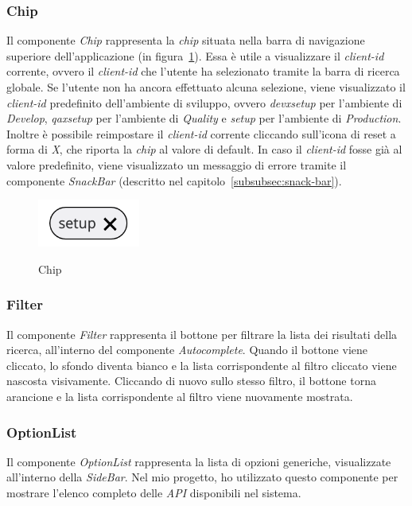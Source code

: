 \subsubsection{Chip}\label{subsubsec:chip}
Il componente \textit{Chip} rappresenta la \textit{chip} situata nella barra di navigazione superiore dell'applicazione (in figura~\ref{fig:chip}).
Essa è utile a visualizzare il \textit{client-id} corrente, ovvero il \textit{client-id} che l'utente ha selezionato tramite la barra di ricerca globale.
Se l'utente non ha ancora effettuato alcuna selezione, viene visualizzato il \textit{client-id} predefinito dell'ambiente di sviluppo, ovvero \textit{devxsetup} per l'ambiente di \textit{Develop}, \textit{qaxsetup} per l'ambiente di \textit{Quality} e \textit{setup} per l'ambiente di \textit{Production}.
Inoltre è possibile reimpostare il \textit{client-id} corrente cliccando sull'icona di reset a forma di \textit{X}, che riporta la \textit{chip} al valore di default.
In caso il \textit{client-id} fosse già al valore predefinito, viene visualizzato un messaggio di errore tramite il componente \textit{SnackBar} (descritto nel capitolo~\ref{subsubsec:snack-bar}).

\begin{figure}[ht]
  \centering
  \includegraphics[width=0.3\textwidth, alt={Chip contenente il client id corrente}]{images/frontend/Chip.jpg}
  \caption{Chip}\label{fig:chip}
\end{figure}


\subsubsection{Filter}\label{subsubsec:filter}
Il componente \textit{Filter} rappresenta il bottone per filtrare la lista dei risultati della ricerca, all'interno del componente \textit{Autocomplete}.
Quando il bottone viene cliccato, lo sfondo diventa bianco e la lista corrispondente al filtro cliccato viene nascosta visivamente.
Cliccando di nuovo sullo stesso filtro, il bottone torna arancione e la lista corrispondente al filtro viene nuovamente mostrata.


\subsubsection{OptionList}\label{subsubsec:option-list}
Il componente \textit{OptionList} rappresenta la lista di opzioni generiche, visualizzate all'interno della \textit{SideBar}. Nel mio progetto, ho utilizzato questo componente per mostrare l'elenco completo delle \textit{API} disponibili nel sistema.

